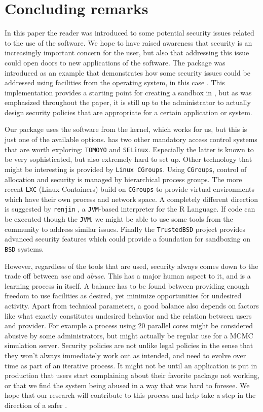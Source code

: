 \section{Concluding remarks}

In this paper the reader was introduced to some potential security issues
related to the use of the \R software. We hope to have raised awareness that
security is an increasingly important concern for the \R user, but also that
addressing this issue could open doors to new applications of the software. The
\RAppArmor package was introduced as an example that demonstrates how some
security issues could be addressed using facilities from the operating system,
in this case \Linux. This implementation provides a starting point for creating
a sandbox in \R, but as was emphasized throughout the paper, it is still up to
the administrator to actually design security policies that are appropriate for
a certain application or system.

Our package uses the \AppArmor software from the \Linux kernel, which works for
us, but this is just one of the available options. \Linux has two other
mandatory access control systems that are worth exploring: \texttt{TOMOYO} and
\texttt{SELinux}. Especially the latter is known to be very sophisticated, but
also extremely hard to set up. Other technology that might be interesting is
provided by \texttt{Linux CGroups}. Using \texttt{CGroups}, control of
allocation and security is managed by hierarchical process groups. The more
recent \texttt{LXC} (Linux Containers) build on \texttt{CGroups} to provide
virtual environments which have their own process and network space. A
completely different direction is suggested by \texttt{renjin} \citep{renjin},
a \texttt{JVM}-based interpreter for the R Language. If \R code can be executed
though the \texttt{JVM}, we might be able to use some tools from the \Java
community to address similar issues. Finally the \texttt{TrustedBSD} project
provides advanced security features which could provide a foundation for
sandboxing \R on \texttt{BSD} systems.

However, regardless of the tools that are used, security always comes down to
the trade off between \emph{use} and \emph{abuse}. This has a major human
aspect to it, and is a learning process in itself. A balance has to be found
between providing enough freedom to use facilities as desired, yet minimize
opportunities for undesired activity. Apart from technical parameters, a good
balance also depends on factors like what exactly constitutes undesired
behavior and the relation between users and provider. For example a process
using 20 parallel cores might be considered abusive by some administrators, but
might actually be regular use for a MCMC simulation server. Security policies
are not unlike legal policies in the sense that they won't always immediately
work out as intended, and need to evolve over time as part of an iterative
process. It might not be until an application is put in production that users
start complaining about their favorite package not working, or that we find the
system being abused in a way that was hard to foresee. We hope that our
research will contribute to this process and help take a step in the direction
of a safer \R.
